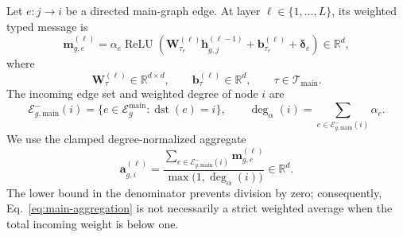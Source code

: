 \documentclass[11pt]{article}
\newcommand{\R}{\mathbb{R}}
\newcommand{\main}{\mathrm{main}}
\DeclareMathOperator{\ReLU}{ReLU}
\DeclareMathOperator{\dst}{dst}
\begin{document}
Let \(e:j\to i\) be a directed main-graph edge.  At layer
\(\ell\in\{1,\ldots,L\}\), its weighted typed message is
\begin{equation}
    \boxed{
    \mathbf m_{g,e}^{(\ell)}
    =
    \alpha_e
    \ReLU
    \left(
        \mathbf W_{\tau_e}^{(\ell)}
        \mathbf h_{g,j}^{(\ell-1)}
        +
        \mathbf b_{\tau_e}^{(\ell)}
        +
        \boldsymbol\delta_e
    \right)
    }
    \in\R^d,
    \label{eq:main-message}
\end{equation}
where
\begin{equation}
    \mathbf W_{\tau}^{(\ell)}\in\R^{d\times d},
    \qquad
    \mathbf b_{\tau}^{(\ell)}\in\R^d,
    \qquad
    \tau\in\mathcal T_{\main}.
    \label{eq:main-edge-domains}
\end{equation}
The incoming edge set and weighted degree of node \(i\) are
\begin{equation}
    \mathcal E_{g,\main}^{-}(i)
    =
    \{e\in\mathcal E_g^{\main}:\dst(e)=i\},
    \qquad
    \deg_{\alpha}(i)
    =
    \sum_{e\in\mathcal E_{g,\main}^{-}(i)}\alpha_e.
    \label{eq:main-incoming-degree}
\end{equation}
We use the clamped degree-normalized aggregate
\begin{equation}
    \boxed{
    \mathbf a_{g,i}^{(\ell)}
    =
    \frac{
        \displaystyle
        \sum_{e\in\mathcal E_{g,\main}^{-}(i)}
        \mathbf m_{g,e}^{(\ell)}
    }{
        \displaystyle
        \max\bigl(1,\deg_{\alpha}(i)\bigr)
    }
    }
    \in\R^d.
    \label{eq:main-aggregation}
\end{equation}
The lower bound in the denominator prevents division by zero; consequently,
Eq.~\eqref{eq:main-aggregation} is not necessarily a strict weighted average
when the total incoming weight is below one.
\end{document}
